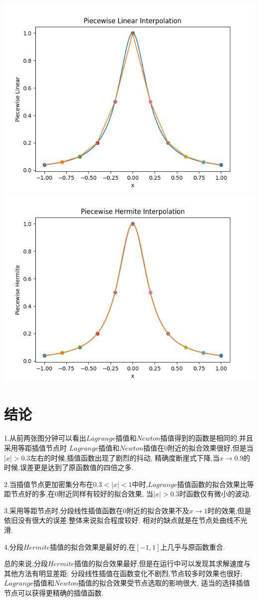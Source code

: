 \documentclass[12pt, a4paper, oneside]{ctexart}
\begin{document}
\includegraphics[scale=0.55]{Piecewise_Linear_3.png}
\includegraphics[scale=0.6]{Piecewise_Hermite_.4png.png}

\section*{结论}

1.从前两张图分钟可以看出$Lagrange$插值和$Newton$插值得到的函数是相同的,并且采用等距插值节点时
$Lagrange$插值和$Newton$插值在$0$附近的拟合效果很好,但是当$|x|>0.3$左右的时候,插值函数出现了剧烈的抖动,
精确度断崖式下降,当$x\to 0.9$的时候,误差更是达到了原函数值的四倍之多.\par

2.当插值节点更加密集分布在$0.3<|x|<1$中时,$Lagrange$插值函数的拟合效果比等距节点好的多,在0附近同样有较好的拟合效果,
当$|x|>0.3$时函数仅有微小的波动.\par

3.采用等距节点时,分段线性插值函数在0附近的拟合效果不及$x\to 1$时的效果,但是依旧没有很大的误差.整体来说拟合程度较好.
相对的缺点就是在节点处曲线不光滑.\par

4.分段$Hermite$插值的拟合效果是最好的,在$[-1,1]$上几乎与原函数重合.\par

总的来说,分段$Hermite$插值的拟合效果最好,但是在运行中可以发现其求解速度与其他方法有明显差距;
分段线性插值在函数变化不剧烈,节点较多时效果也很好;$Lagrange$插值和$Newton$插值的拟合效果受节点选取的影响很大,
适当的选择插值节点可以获得更精确的插值函数.
\end{document}
